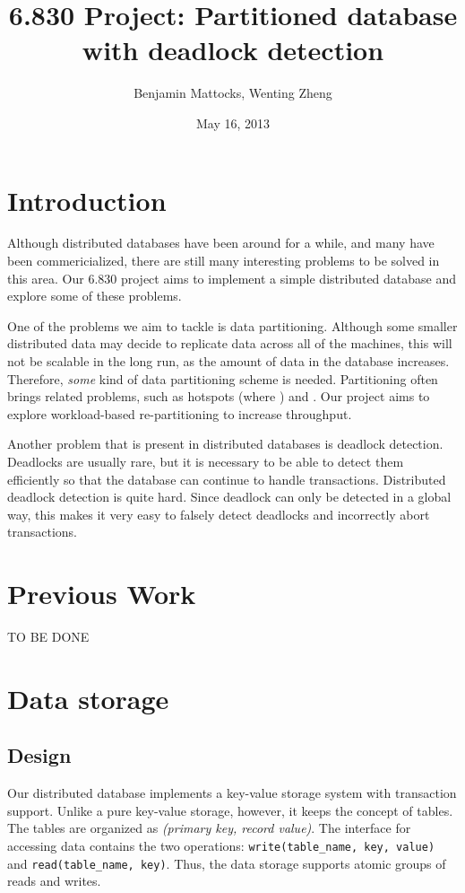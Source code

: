 \documentclass[a4paper, 10pt, notitlepage]{report}
\title{6.830 Project: Partitioned database with deadlock detection}
\author{Benjamin Mattocks, Wenting Zheng}
\date{May 16, 2013} %
\begin{document}
\maketitle
\thispagestyle{empty}
\newpage


\section*{Introduction}

Although distributed databases have been around for a while, and many have been commericialized, there are still many
interesting problems to be solved in this area. Our 6.830 project aims to implement a simple distributed database
and explore some of these problems.

One of the problems we aim to tackle is data partitioning. Although some smaller distributed data may decide to replicate
data across all of the machines, this will not be scalable in the long run, as the amount of data in the database
increases. Therefore, {\em some} kind of data partitioning scheme is needed. Partitioning often brings related problems, such
as hotspots (where ) and . Our project aims to explore workload-based re-partitioning to increase throughput.

Another problem that is present in distributed databases is deadlock detection. Deadlocks are usually rare, but it is necessary
to be able to detect them efficiently so that the database can continue to handle transactions. Distributed deadlock detection
is quite hard. Since deadlock can only be detected in a global way, this makes it very easy to falsely detect deadlocks and
incorrectly abort transactions.


\section*{Previous Work}

TO BE DONE

\section*{Data storage}

\subsection*{Design}
Our distributed database implements a key-value storage system with transaction support. Unlike a pure key-value storage, however,
it keeps the concept of tables. The tables are organized as {\em (primary key, record value)}.
The interface for accessing data contains the two operations: \texttt{write(table\_name, key, value)} and \texttt{read(table\_name, key)}.
Thus, the data storage supports atomic groups of reads and writes.
\end{document}
